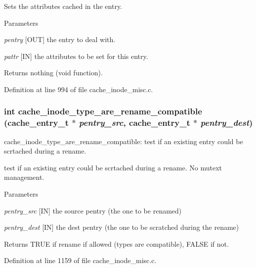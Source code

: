 Sets the attributes cached in the entry.


\begin{DoxyParams}{Parameters}
\item[{\em pentry}][OUT] the entry to deal with. \item[{\em pattr}][IN] the attributes to be set for this entry.\end{DoxyParams}
\begin{DoxyReturn}{Returns}
nothing (void function). 
\end{DoxyReturn}


Definition at line 994 of file cache\_\-inode\_\-misc.c.
\subsubsection[{cache\_\-inode\_\-type\_\-are\_\-rename\_\-compatible}]{\setlength{\rightskip}{0pt plus 5cm}int cache\_\-inode\_\-type\_\-are\_\-rename\_\-compatible (cache\_\-entry\_\-t $\ast$ {\em pentry\_\-src}, \/  cache\_\-entry\_\-t $\ast$ {\em pentry\_\-dest})}\label{cache__inode__misc_8c_a276225d5d7db59f532f94ca6cf32ab53}
cache\_\-inode\_\-type\_\-are\_\-rename\_\-compatible: test if an existing entry could be scrtached during a rename.

test if an existing entry could be scrtached during a rename. No mutext management.


\begin{DoxyParams}{Parameters}
\item[{\em pentry\_\-src}][IN] the source pentry (the one to be renamed) \item[{\em pentry\_\-dest}][IN] the dest pentry (the one to be scratched during the rename)\end{DoxyParams}
\begin{DoxyReturn}{Returns}
TRUE if rename if allowed (types are compatible), FALSE if not. 
\end{DoxyReturn}


Definition at line 1159 of file cache\_\-inode\_\-misc.c.
